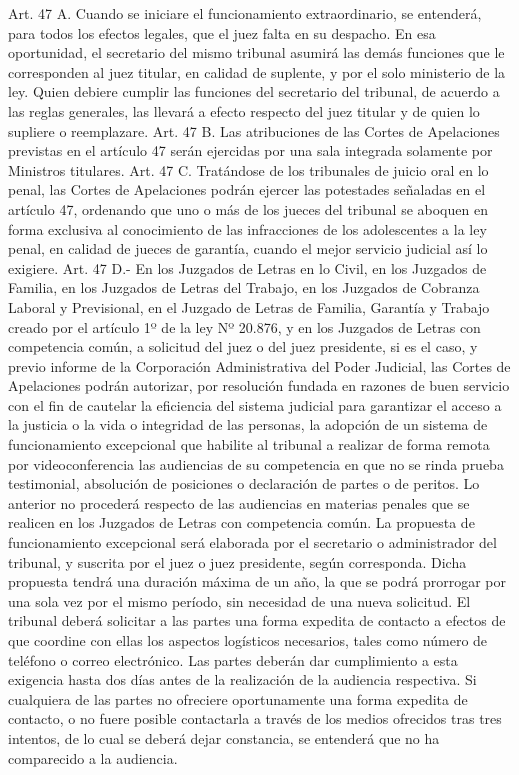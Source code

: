     Art. 47 A. Cuando se iniciare el funcionamiento extraordinario, se entenderá, para todos los efectos legales, que el juez falta en su despacho. En esa oportunidad, el secretario del mismo tribunal asumirá las demás funciones que le corresponden al juez titular, en calidad de suplente, y por el solo ministerio de la ley.
    Quien debiere cumplir las funciones del secretario del tribunal, de acuerdo a las reglas generales, las llevará a efecto respecto del juez titular y de quien lo supliere o reemplazare.
    Art. 47 B. Las atribuciones de las Cortes de Apelaciones previstas en el artículo 47 serán ejercidas por una sala integrada solamente por Ministros titulares.
    Art. 47 C. Tratándose de los tribunales de juicio oral en lo penal, las Cortes de Apelaciones podrán ejercer las potestades señaladas en el artículo 47, ordenando que uno o más de los jueces del tribunal se aboquen en forma exclusiva al conocimiento de las infracciones de los adolescentes a la ley penal, en calidad de jueces de garantía, cuando el mejor servicio judicial así lo exigiere.
    Art. 47 D.- En los Juzgados de Letras en lo Civil, en los Juzgados de Familia, en los Juzgados de Letras del Trabajo, en los Juzgados de Cobranza Laboral y Previsional, en el Juzgado de Letras de Familia, Garantía y Trabajo creado por el artículo 1º de la ley Nº 20.876, y en los Juzgados de Letras con competencia común, a solicitud del juez o del juez presidente, si es el caso, y previo informe de la Corporación Administrativa del Poder Judicial, las Cortes de Apelaciones podrán autorizar, por resolución fundada en razones de buen servicio con el fin de cautelar la eficiencia del sistema judicial para garantizar el acceso a la justicia o la vida o integridad de las personas, la adopción de un sistema de funcionamiento excepcional que habilite al tribunal a realizar de forma remota por videoconferencia las audiencias de su competencia en que no se rinda prueba testimonial, absolución de posiciones o declaración de partes o de peritos. Lo anterior no procederá respecto de las audiencias en materias penales que se realicen en los Juzgados de Letras con competencia común.
    La propuesta de funcionamiento excepcional será elaborada por el secretario o administrador del tribunal, y suscrita por el juez o juez presidente, según corresponda. Dicha propuesta tendrá una duración máxima de un año, la que se podrá prorrogar por una sola vez por el mismo período, sin necesidad de una nueva solicitud.
    El tribunal deberá solicitar a las partes una forma expedita de contacto a efectos de que coordine con ellas los aspectos logísticos necesarios, tales como número de teléfono o correo electrónico. Las partes deberán dar cumplimiento a esta exigencia hasta dos días antes de la realización de la audiencia respectiva. Si cualquiera de las partes no ofreciere oportunamente una forma expedita de contacto, o no fuere posible contactarla a través de los medios ofrecidos tras tres intentos, de lo cual se deberá dejar constancia, se entenderá que no ha comparecido a la audiencia.
